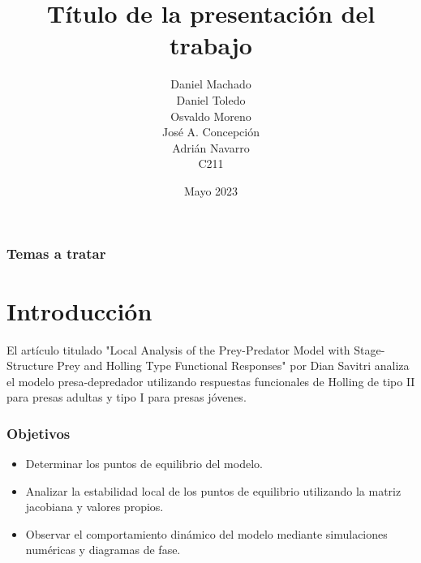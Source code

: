 \documentclass{beamer}
\title[T\'itulo del trabajo]{T\'itulo de la presentaci\'on del trabajo}
\author[Machado, Toledo, Moreno, Concepci\'on, Navarro]
		{
			Daniel Machado \\
			Daniel Toledo \\
			Osvaldo Moreno \\
			Jos\'e A. Concepci\'on \\
			Adri\'an Navarro \\
			{\small C211}
		}
\date{Mayo 2023}
\begin{document}

\begin{frame}
	\frametitle{Temas a tratar} 
	\tableofcontents 
\end{frame}

\section{Introducci\'on}
\begin{frame}
\begin{minipage}{10cm}
	El artículo titulado "Local Analysis of the Prey-Predator Model with Stage-Structure Prey and Holling
	Type Functional Responses" por Dian Savitri analiza el modelo presa-depredador utilizando respuestas funcionales de Holling de tipo II para presas adultas y tipo I para presas j\'ovenes.
\end{minipage}
\end{frame}

\begin{frame}
\frametitle{Objetivos}
	\begin{minipage}{10cm}
		\begin{itemize}
			\item Determinar los puntos de equilibrio del modelo.
			\item Analizar la estabilidad local de los puntos de equilibrio utilizando la matriz jacobiana y valores propios.
			\item Observar el comportamiento dinámico del modelo mediante
			simulaciones numéricas y diagramas de fase.
		\end{itemize}
	\end{minipage}
\end{frame}
\end{document}
